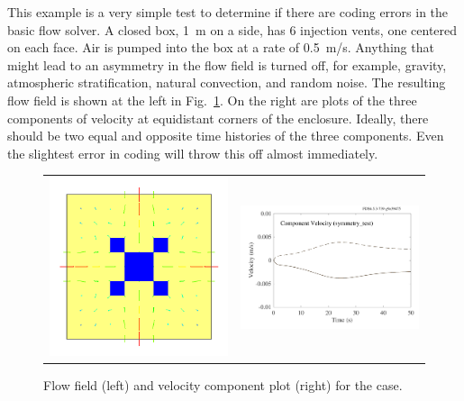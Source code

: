 \documentclass[11pt]{book}
\begin{document}
This example is a very simple test to determine if there are coding errors in the basic flow solver. A closed box, 1~m on a side, has 6 injection vents, one centered on each face.
Air is pumped into the box at a rate of 0.5~m/s. Anything that might lead to an asymmetry in the flow field is turned off, for example, gravity, atmospheric stratification,
natural convection, and random noise. The resulting flow field is shown at the left in Fig.~\ref{symmetry_test}. On the right are plots of the three components of velocity
at equidistant corners of the enclosure. Ideally, there should be two equal and opposite time histories of the three components. Even the slightest error in coding will throw
this off almost immediately.
\begin{figure}[h!]
\begin{tabular*}{\textwidth}{lr}
\includegraphics[width=3.2in]{SCRIPT_FIGURES/symmetry_test} &
\includegraphics[width=3.2in]{SCRIPT_FIGURES/symmetry_test_plot}
\end{tabular*}
\caption[The  test case]{Flow field (left) and velocity component plot (right) for the  case.}
\label{symmetry_test}
\end{figure}
\end{document}
